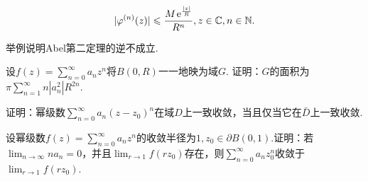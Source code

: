\begin{xiti}
\begin{enuma}
         \[
           |\varphi^{(n)}(z)| \leqslant \frac{M\operatorname{\!\!\;\mathrm e}^{\frac{|z|}R}}{R^n}, z\in\mathbb C,n\in\mathbb N.
         \]
    \end{enuma}
  \item 举例说明Abel第二定理的逆不成立.
  \item 设$f(z)=\sum_{n=0}^\infty a_nz^n$将$B(0,R)$一一地映为域$G$. 证明：$G$的面积为$\pi\sum_{n=1}^\infty n|a_n^2|R^{2n}$.
  \item 证明：幂级数$\sum_{n=0}^\infty a_n(z-z_0)^n$在域$D$上一致收敛，当且仅当它在$\bar D$上一致收敛.
  \item 设幂级数$f(z)=\sum_{n=0}^\infty a_nz^n$的收敛半径为$1,z_0\in\partial B(0,1)$.证明：若$\lim_{n\to\infty}na_n=0$，并且$\lim_{r\to1}f(rz_0)$存在，则$\sum_{n=0}^\infty a_nz_0^n$收敛于$\lim_{r\to1}f(rz_0)$.
\end{xiti}

